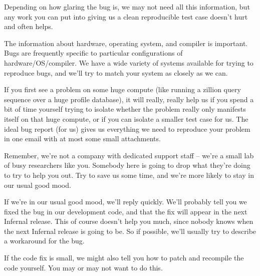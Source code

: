 Depending on how glaring the bug is, we may not need all this
information, but any work you can put into giving us a clean
reproducible test case doesn't hurt and often helps.

The information about hardware, operating system, and compiler is
important. Bugs are frequently specific to particular configurations
of hardware/OS/compiler.  We have a wide variety of systems available
for trying to reproduce bugs, and we'll try to match your system as
closely as we can.

If you first see a problem on some huge compute (like running a
zillion query sequence over a huge profile database), it will really,
really help us if you spend a bit of time yourself trying to isolate
whether the problem really only manifests itself on that huge compute,
or if you can isolate a smaller test case for us. The ideal bug report
(for us) gives us everything we need to reproduce your problem in one
email with at most some small attachments. 

Remember, we're not a company with dedicated support staff -- we're a
small lab of busy researchers like you. Somebody here is going to drop
what they're doing to try to help you out. Try to save us some time,
and we're more likely to stay in our usual good mood.

If we're in our usual good mood, we'll reply quickly.  We'll probably
tell you we fixed the bug in our development code, and that the fix
will appear in the next Infernal release. This of course doesn't help you
much, since nobody knows when the next Infernal release is going to be.
So if possible, we'll usually try to describe a workaround for the
bug.

If the code fix is small, we might also tell you how to patch and
recompile the code yourself. You may or may not want to do this.













  









